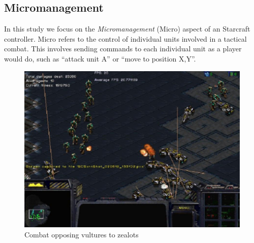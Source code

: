 
\subsection{Micromanagement}

In this study we focus on the \emph{Micromanagement} (Micro) aspect of
an Starcraft controller. Micro refers to the control of individual
units involved in a tactical combat. This involves sending commands to
each individual unit as a player would do, such as ``attack unit A'' or
``move to position X,Y''.

\begin{figure}
  \includegraphics[width=.5\textwidth]{figures/vultures_vs_zealots_combat}
  \caption{Combat opposing vultures to zealots}\label{fig:combat-example}
\end{figure}


